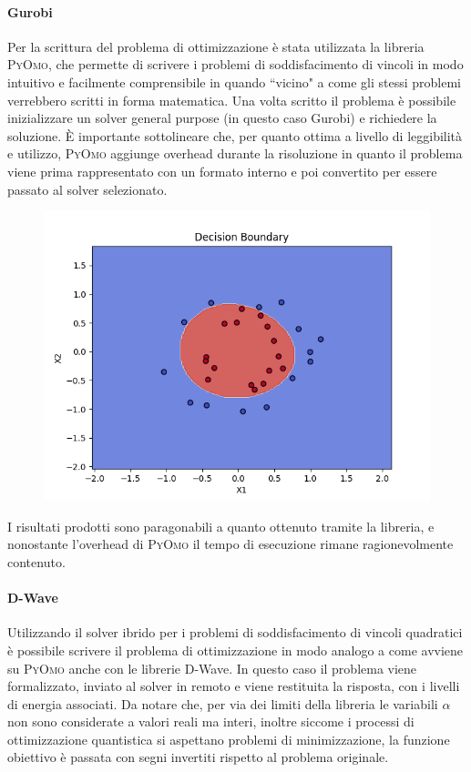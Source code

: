 \documentclass[12pt]{article}
\begin{document}
\paragraph{Gurobi} Per la scrittura del problema di ottimizzazione è stata utilizzata la libreria \textsc{PyOmo},
che permette di scrivere i problemi di soddisfacimento di vincoli in modo intuitivo e facilmente comprensibile in quando “vicino" a come gli stessi problemi verrebbero scritti in forma matematica.
Una volta scritto il problema è possibile inizializzare un solver general purpose (in questo caso Gurobi) e richiedere la soluzione.
È importante sottolineare che, per quanto ottima a livello di leggibilità e utilizzo, 
\textsc{PyOmo} aggiunge overhead durante la risoluzione in quanto il problema viene prima rappresentato con un formato interno e poi convertito per essere passato al solver selezionato.

\begin{figure}[H]
  \centering
  \includegraphics[width=\linewidth]{img/decision_boundary_gurobi.png}
\end{figure}

I risultati prodotti sono paragonabili a quanto ottenuto tramite la libreria, e nonostante l'overhead di \textsc{PyOmo} il tempo di esecuzione rimane ragionevolmente contenuto.

\paragraph{D-Wave} Utilizzando il solver ibrido per i problemi di soddisfacimento di vincoli quadratici è possibile scrivere il problema di ottimizzazione in modo analogo a come avviene su \textsc{PyOmo} anche con le librerie D-Wave.
In questo caso il problema viene formalizzato, inviato al solver in remoto e viene restituita la risposta, con i livelli di energia associati.
Da notare che, per via dei limiti della libreria le variabili $\alpha$ non sono considerate a valori reali ma interi,
inoltre siccome i processi di ottimizzazione quantistica si aspettano problemi di minimizzazione, la funzione obiettivo è passata con segni invertiti rispetto al problema originale.
\end{document}
